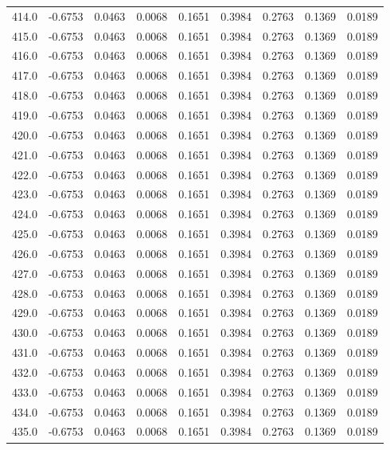 \begin{longtable}{lrrrrrrrr}
414.0 & -0.6753 & 0.0463 & 0.0068 & 0.1651 & 0.3984 & 0.2763 & 0.1369 & 0.0189 \\
415.0 & -0.6753 & 0.0463 & 0.0068 & 0.1651 & 0.3984 & 0.2763 & 0.1369 & 0.0189 \\
416.0 & -0.6753 & 0.0463 & 0.0068 & 0.1651 & 0.3984 & 0.2763 & 0.1369 & 0.0189 \\
417.0 & -0.6753 & 0.0463 & 0.0068 & 0.1651 & 0.3984 & 0.2763 & 0.1369 & 0.0189 \\
418.0 & -0.6753 & 0.0463 & 0.0068 & 0.1651 & 0.3984 & 0.2763 & 0.1369 & 0.0189 \\
419.0 & -0.6753 & 0.0463 & 0.0068 & 0.1651 & 0.3984 & 0.2763 & 0.1369 & 0.0189 \\
420.0 & -0.6753 & 0.0463 & 0.0068 & 0.1651 & 0.3984 & 0.2763 & 0.1369 & 0.0189 \\
421.0 & -0.6753 & 0.0463 & 0.0068 & 0.1651 & 0.3984 & 0.2763 & 0.1369 & 0.0189 \\
422.0 & -0.6753 & 0.0463 & 0.0068 & 0.1651 & 0.3984 & 0.2763 & 0.1369 & 0.0189 \\
423.0 & -0.6753 & 0.0463 & 0.0068 & 0.1651 & 0.3984 & 0.2763 & 0.1369 & 0.0189 \\
424.0 & -0.6753 & 0.0463 & 0.0068 & 0.1651 & 0.3984 & 0.2763 & 0.1369 & 0.0189 \\
425.0 & -0.6753 & 0.0463 & 0.0068 & 0.1651 & 0.3984 & 0.2763 & 0.1369 & 0.0189 \\
426.0 & -0.6753 & 0.0463 & 0.0068 & 0.1651 & 0.3984 & 0.2763 & 0.1369 & 0.0189 \\
427.0 & -0.6753 & 0.0463 & 0.0068 & 0.1651 & 0.3984 & 0.2763 & 0.1369 & 0.0189 \\
428.0 & -0.6753 & 0.0463 & 0.0068 & 0.1651 & 0.3984 & 0.2763 & 0.1369 & 0.0189 \\
429.0 & -0.6753 & 0.0463 & 0.0068 & 0.1651 & 0.3984 & 0.2763 & 0.1369 & 0.0189 \\
430.0 & -0.6753 & 0.0463 & 0.0068 & 0.1651 & 0.3984 & 0.2763 & 0.1369 & 0.0189 \\
431.0 & -0.6753 & 0.0463 & 0.0068 & 0.1651 & 0.3984 & 0.2763 & 0.1369 & 0.0189 \\
432.0 & -0.6753 & 0.0463 & 0.0068 & 0.1651 & 0.3984 & 0.2763 & 0.1369 & 0.0189 \\
433.0 & -0.6753 & 0.0463 & 0.0068 & 0.1651 & 0.3984 & 0.2763 & 0.1369 & 0.0189 \\
434.0 & -0.6753 & 0.0463 & 0.0068 & 0.1651 & 0.3984 & 0.2763 & 0.1369 & 0.0189 \\
435.0 & -0.6753 & 0.0463 & 0.0068 & 0.1651 & 0.3984 & 0.2763 & 0.1369 & 0.0189 \\

\end{longtable}
